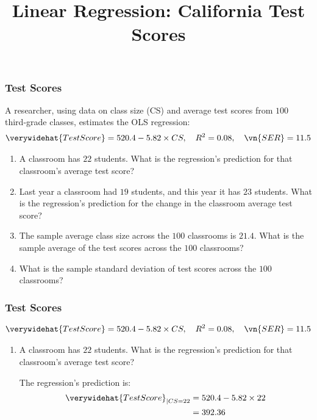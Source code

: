 \title[Test Scores]{Linear Regression: California Test Scores}
\date{}







\def\ask{\begin{align*}
\verywidehat{TestScore} 
  = 520.4 - 5.82 \times CS,
  \quad R^2 = 0.08,
  \quad \vn{SER} = 11.5
\end{align*}}


\begin{frame}
\frametitle{Test Scores}
A researcher, using data on class size (CS) and average test scores from $100$ third-grade classes, estimates the OLS regression:
\ask
\begin{enumerate}
\item A classroom has $22$ students. What is the regression's prediction for that classroom's average test score?
\item Last year a classroom had $19$ students, and this year it has $23$ students. What is the regression's prediction for the change in the classroom average test score?
\item The sample average class size across the $100$ classrooms is $21.4$. What is the sample average of the test scores across the $100$ classrooms?
\item What is the sample standard deviation of test scores across the $100$ classrooms?
\end{enumerate}
\end{frame}


\begin{frame}
\frametitle{Test Scores}
\ask

\begin{enumerate}\setcounter{enumi}{0}

\item A classroom has $22$ students. What is the regression's prediction for that classroom's average test score?

\begin{answer}
The regression's prediction is: 
\begin{align*}
\verywidehat{TestScore}_{|CS=22}
  & = 520.4 - 5.82 \times 22\\
  & = 392.36
\end{align*}
\end{answer}

\end{enumerate}
\end{frame}


